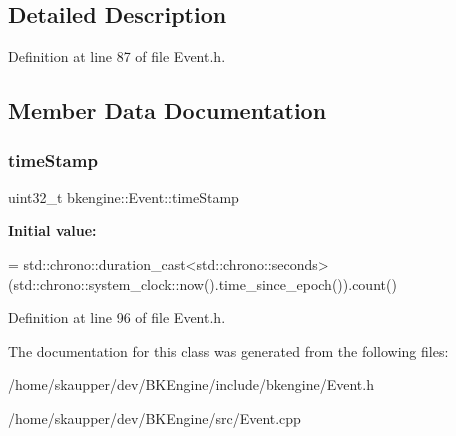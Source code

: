 \subsection{Detailed Description}


Definition at line 87 of file Event.\+h.



\subsection{Member Data Documentation}
\mbox{\label{classbkengine_1_1Event_a4d84f11e0495c24c8056653b33e62d3e}} 
\subsubsection{\texorpdfstring{time\+Stamp}{timeStamp}}
{\footnotesize\ttfamily uint32\+\_\+t bkengine\+::\+Event\+::time\+Stamp}

{\bfseries Initial value\+:}
\begin{DoxyCode}
= std::chrono::duration\_cast<std::chrono::seconds>
                                 (std::chrono::system\_clock::now().time\_since\_epoch()).count()
\end{DoxyCode}


Definition at line 96 of file Event.\+h.



The documentation for this class was generated from the following files\+:\begin{DoxyCompactItemize}
\item 
/home/skaupper/dev/\+B\+K\+Engine/include/bkengine/Event.\+h\item 
/home/skaupper/dev/\+B\+K\+Engine/src/Event.\+cpp\end{DoxyCompactItemize}
